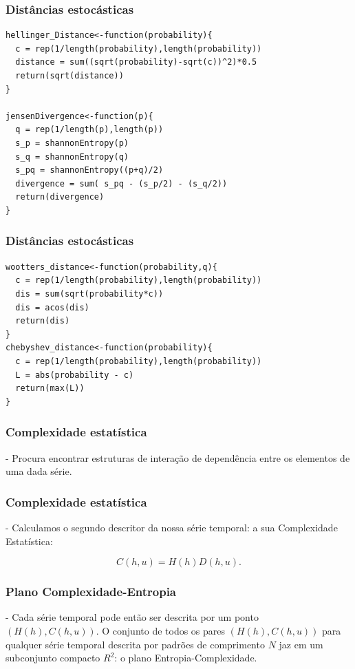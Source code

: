 \documentclass[10pt, compress]{beamer}
\begin{document}
\begin{frame}[fragile]
\frametitle{Distâncias estocásticas}
 \begin{lstlisting}
hellinger_Distance<-function(probability){
  c = rep(1/length(probability),length(probability))
  distance = sum((sqrt(probability)-sqrt(c))^2)*0.5
  return(sqrt(distance))
}

jensenDivergence<-function(p){
  q = rep(1/length(p),length(p))
  s_p = shannonEntropy(p)
  s_q = shannonEntropy(q)
  s_pq = shannonEntropy((p+q)/2)
  divergence = sum( s_pq - (s_p/2) - (s_q/2))
  return(divergence)
}
\end{lstlisting}
\end{frame}

\begin{frame}[fragile]
\frametitle{Distâncias estocásticas}
 \begin{lstlisting}
wootters_distance<-function(probability,q){
  c = rep(1/length(probability),length(probability))
  dis = sum(sqrt(probability*c))
  dis = acos(dis)
  return(dis)
}
chebyshev_distance<-function(probability){
  c = rep(1/length(probability),length(probability))
  L = abs(probability - c)
  return(max(L))
}
\end{lstlisting}
\end{frame}

 
\begin{frame}[fragile]
\frametitle{Complexidade estatística}

- Procura encontrar estruturas de interação
de dependência entre os elementos de uma dada série.

\end{frame}
 
\begin{frame}[fragile]
\frametitle{Complexidade estatística}

- Calculamos o segundo descritor da nossa série temporal: a sua Complexidade Estatística:

\begin{equation}
C( h, u) = H( h) D( h,  u).
\end{equation}

\end{frame}

\begin{frame}[fragile]
\frametitle{ Plano Complexidade-Entropia}

- Cada série temporal pode então ser descrita por um ponto $(H( h), C( h,  u))$.
O conjunto de todos os pares $(H( h), C( h,  u))$ para qualquer série temporal descrita por padrões de comprimento $N$ jaz em um subconjunto compacto $ R^2$: o plano Entropia-Complexidade.

\end{frame}
\end{document}
